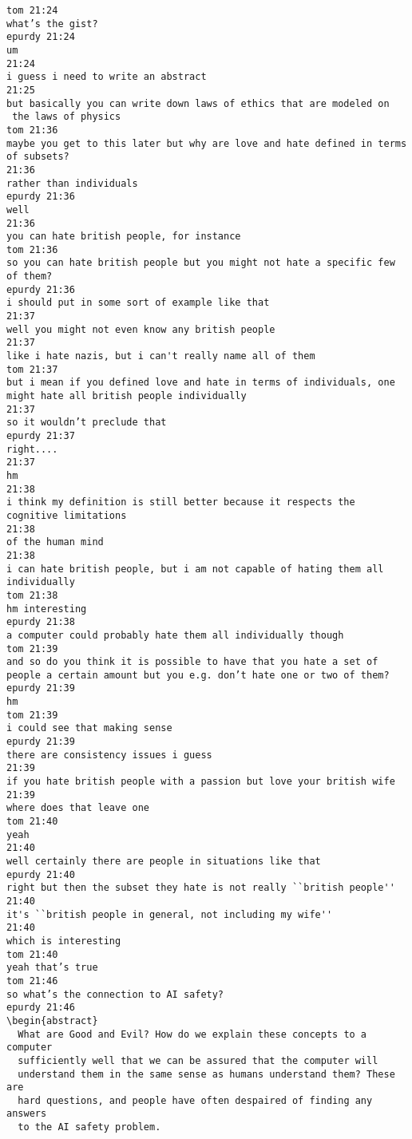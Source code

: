 \begin{verbatim}
tom 21:24
what’s the gist?
epurdy 21:24
um
21:24
i guess i need to write an abstract
21:25
but basically you can write down laws of ethics that are modeled on
 the laws of physics
tom 21:36
maybe you get to this later but why are love and hate defined in terms
of subsets?
21:36
rather than individuals
epurdy 21:36
well
21:36
you can hate british people, for instance
tom 21:36
so you can hate british people but you might not hate a specific few
of them?
epurdy 21:36
i should put in some sort of example like that
21:37
well you might not even know any british people
21:37
like i hate nazis, but i can't really name all of them
tom 21:37
but i mean if you defined love and hate in terms of individuals, one
might hate all british people individually
21:37
so it wouldn’t preclude that
epurdy 21:37
right....
21:37
hm
21:38
i think my definition is still better because it respects the
cognitive limitations
21:38
of the human mind
21:38
i can hate british people, but i am not capable of hating them all
individually
tom 21:38
hm interesting
epurdy 21:38
a computer could probably hate them all individually though
tom 21:39
and so do you think it is possible to have that you hate a set of
people a certain amount but you e.g. don’t hate one or two of them?
epurdy 21:39
hm
tom 21:39
i could see that making sense
epurdy 21:39
there are consistency issues i guess
21:39
if you hate british people with a passion but love your british wife
21:39
where does that leave one
tom 21:40
yeah
21:40
well certainly there are people in situations like that
epurdy 21:40
right but then the subset they hate is not really ``british people''
21:40
it's ``british people in general, not including my wife''
21:40
which is interesting
tom 21:40
yeah that’s true
tom 21:46
so what’s the connection to AI safety?
epurdy 21:46
\begin{abstract}
  What are Good and Evil? How do we explain these concepts to a computer
  sufficiently well that we can be assured that the computer will
  understand them in the same sense as humans understand them? These are
  hard questions, and people have often despaired of finding any answers
  to the AI safety problem.


\end{verbatim}
